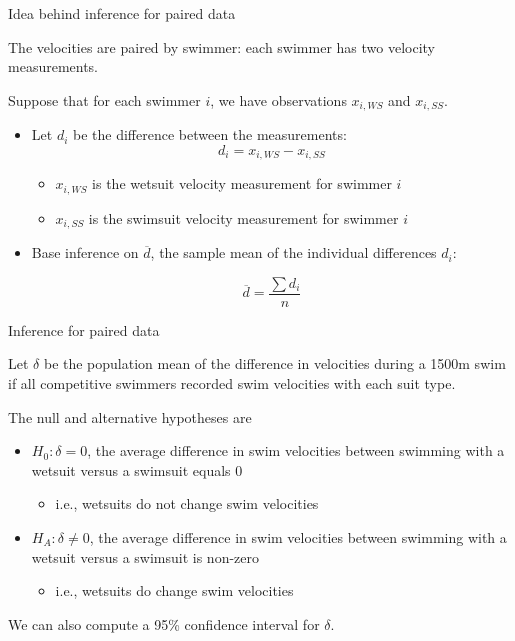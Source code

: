 \documentclass[
  ignorenonframetext,
  aspectratio=169]{beamer}
\providecommand{\tightlist}{%
  \setlength{\itemsep}{0pt}\setlength{\parskip}{0pt}}
\begin{document}
\begin{frame}{Idea behind inference for paired data}
\protect\hypertarget{idea-behind-inference-for-paired-data}{}
\small

The velocities are paired by swimmer: each swimmer has two velocity
measurements.

Suppose that for each swimmer \(i\), we have observations \(x_{i, WS}\)
and \(x_{i, SS}\).

\begin{itemize}
\item
  Let \(d_i\) be the difference between the measurements:
  \[d_i = x_{i, WS} - x_{i, SS}\]

  \begin{itemize}
  \item
    \(x_{i, WS}\) is the wetsuit velocity measurement for swimmer \(i\)
  \item
    \(x_{i, SS}\) is the swimsuit velocity measurement for swimmer \(i\)
  \end{itemize}
\item
  Base inference on \(\overline{d}\), the sample mean of the individual
  differences \(d_i\):

  \[\overline{d} = \frac{\sum d_i}{n}\]
\end{itemize}
\end{frame}

\begin{frame}{Inference for paired data}
\protect\hypertarget{inference-for-paired-data}{}
\small

Let \(\delta\) be the population mean of the difference in velocities
during a 1500m swim if all competitive swimmers recorded swim velocities
with each suit type.

The null and alternative hypotheses are

\begin{itemize}
\item
  \(H_0: \delta= 0\), the average difference in swim velocities between
  swimming with a wetsuit versus a swimsuit equals 0

  \begin{itemize}
  \tightlist
  \item
    i.e., wetsuits do not change swim velocities
  \end{itemize}
\item
  \(H_A: \delta \neq 0\), the average difference in swim velocities
  between swimming with a wetsuit versus a swimsuit is non-zero

  \begin{itemize}
  \tightlist
  \item
    i.e., wetsuits do change swim velocities
  \end{itemize}
\end{itemize}

We can also compute a 95\% confidence interval for \(\delta\).
\end{frame}
\end{document}
